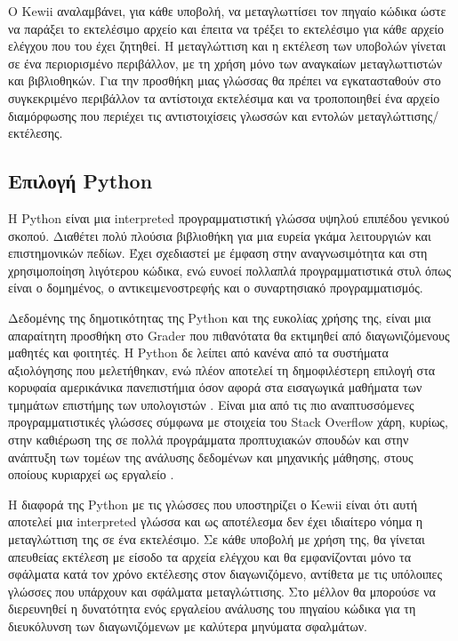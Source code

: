 \documentclass[diploma]{softlab-thesis}
\begin{document}
\bigskip

Ο Kewii αναλαμβάνει, για κάθε υποβολή, να μεταγλωττίσει τον πηγαίο κώδικα ώστε
να παράξει το εκτελέσιμο αρχείο και έπειτα να τρέξει το εκτελέσιμο για κάθε
αρχείο ελέγχου που του έχει ζητηθεί. Η μεταγλώττιση και η εκτέλεση των υποβολών
γίνεται σε ένα περιορισμένο περιβάλλον, με τη χρήση μόνο των αναγκαίων
μεταγλωττιστών και βιβλιοθηκών. Για την προσθήκη μιας γλώσσας θα πρέπει να
εγκατασταθούν στο συγκεκριμένο περιβάλλον τα αντίστοιχα εκτελέσιμα και να
τροποποιηθεί ένα αρχείο διαμόρφωσης που περιέχει τις αντιστοιχίσεις γλωσσών
και εντολών μεταγλώττισης/εκτέλεσης.

\subsection{Επιλογή Python}

Η Python είναι μια interpreted προγραμματιστική γλώσσα υψηλού επιπέδου
γενικού σκοπού. Διαθέτει πολύ πλούσια βιβλιοθήκη για μια ευρεία γκάμα
λειτουργιών και επιστημονικών πεδίων. Έχει σχεδιαστεί με έμφαση στην
αναγνωσιμότητα και στη χρησιμοποίηση λιγότερου κώδικα, ενώ ευνοεί πολλαπλά
προγραμματιστικά στυλ όπως είναι ο δομημένος, ο αντικειμενοστρεφής και ο συναρτησιακό προγραμματισμός.

\bigskip

Δεδομένης της δημοτικότητας της Python και της ευκολίας χρήσης της, είναι μια
απαραίτητη προσθήκη στο Grader που πιθανότατα θα εκτιμηθεί από διαγωνιζόμενους
μαθητές και φοιτητές. Η Python δε λείπει από κανένα από τα συστήματα
αξιολόγησης που μελετήθηκαν, ενώ πλέον αποτελεί τη δημοφιλέστερη επιλογή στα
κορυφαία αμερικάνικα πανεπιστήμια όσον αφορά στα εισαγωγικά μαθήματα των
τμημάτων επιστήμης των υπολογιστών \cite{website:popularpython}.  Είναι μια από
τις πιο αναπτυσσόμενες προγραμματιστικές γλώσσες σύμφωνα με στοιχεία του Stack
Overflow \cite{website:pythongrowth} χάρη, κυρίως, στην καθιέρωση της σε πολλά
προγράμματα προπτυχιακών σπουδών και στην ανάπτυξη των τομέων της ανάλυσης
δεδομένων και μηχανικής μάθησης, στους οποίους κυριαρχεί ως εργαλείο
\cite{website:whypython}.

\bigskip

Η διαφορά της Python με τις γλώσσες που υποστηρίζει ο Kewii είναι ότι αυτή
αποτελεί μια interpreted γλώσσα και ως αποτέλεσμα δεν έχει ιδιαίτερο νόημα η
μεταγλώττιση της σε ένα εκτελέσιμο. Σε κάθε υποβολή με χρήση της, θα γίνεται
απευθείας εκτέλεση με είσοδο τα αρχεία ελέγχου και θα εμφανίζονται μόνο τα
σφάλματα κατά τον χρόνο εκτέλεσης στον διαγωνιζόμενο, αντίθετα με τις υπόλοιπες
γλώσσες που υπάρχουν και σφάλματα μεταγλώττισης. Στο μέλλον θα μπορούσε να
διερευνηθεί η δυνατότητα ενός εργαλείου ανάλυσης του πηγαίου κώδικα για τη
διευκόλυνση των διαγωνιζόμενων με καλύτερα μηνύματα σφαλμάτων.
\end{document}
